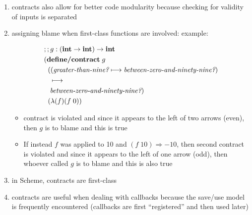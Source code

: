 \documentclass[12pt]{article}	%
\newcommand{\keyw}[1]{ \ensuremath{ \textbf{#1} } }
\newcommand{\integer}{ \keyw{int} }
\newcommand{\intint}{ \ensuremath{ \integer\rightarrow\integer } }
\newcommand{\defcontract}{ \keyw{define/contract} }
\newcommand{\contract}{ \ensuremath{ \longmapsto } }
\begin{document}
\begin{enumerate}
	\item contracts also allow for better code modularity because checking for validity of inputs is separated
	\item assigning blame when first-class functions are involved:
	example:



\begin{align*}
& ;; g:(\intint)\rightarrow\integer \\
& (\defcontract \; g \\
& \;\;((\greaterthannine \contract \betweenzeroandninetynine) \\
& \hspace{3mm} \contract \\
& \hspace{3mm} \betweenzeroandninetynine) \\
& \;\;(\lambda(f)(f \; 0)) 
\end{align*}

\begin{itemize}
\item \greaterthannine contract is violated and since it appears to the left of two arrows (even), then $g$ is to blame and this is true
\item If instead $f$ was applied to 10 and $(f \; 10) \Rightarrow -10$, then second \betweenzeroandninetynine contract is violated and since it appears to the left of one arrow (odd), then whoever called $g$ is to blame and this is also true
\end{itemize}

	\item in Scheme, contracts are first-class
	\item contracts are useful when dealing with callbacks because the save/use model is frequently encountered (callbacks are first ``registered'' and then used later)


\end{enumerate}
\end{document}
